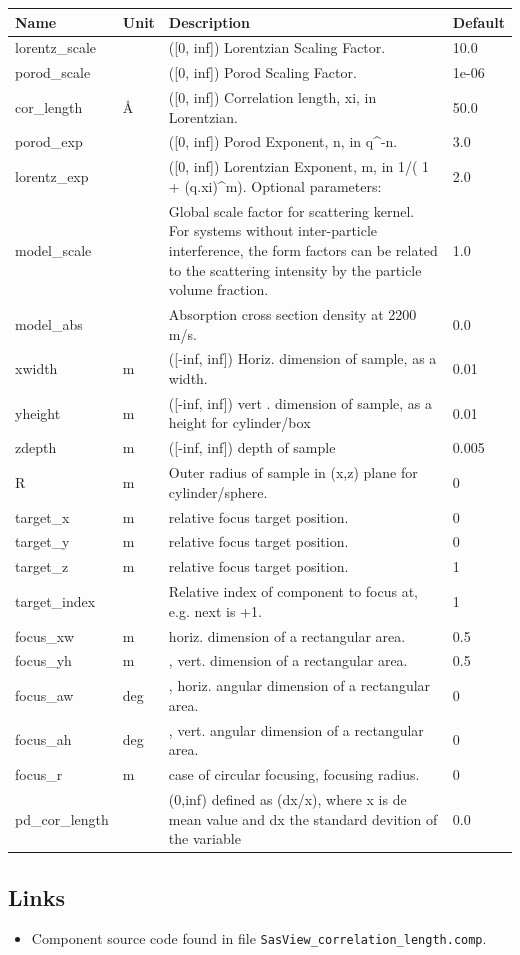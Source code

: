 \begin{longtable}{p{}p{}p{}p{}}
\toprule
\textbf{Name} & \textbf{Unit} & \textbf{Description} & \textbf{Default} \\
\midrule
\endhead
lorentz\_scale &  & ([0, inf]) Lorentzian Scaling Factor. & 10.0 \\
porod\_scale &  & ([0, inf]) Porod Scaling Factor. & 1e-06 \\
cor\_length & \AA{} & ([0, inf]) Correlation length, xi, in Lorentzian. & 50.0 \\
porod\_exp &  & ([0, inf]) Porod Exponent, n, in q\textasciicircum{}-n. & 3.0 \\
lorentz\_exp &  & ([0, inf]) Lorentzian Exponent, m, in 1/( 1 + (q.xi)\textasciicircum{}m). Optional parameters: & 2.0 \\
model\_scale &   & Global scale factor for scattering kernel. For systems without inter-particle interference, the form factors can be related to the scattering intensity by the particle volume fraction. & 1.0 \\
model\_abs &   & Absorption cross section density at 2200 m/s. & 0.0 \\
xwidth & m & ([-inf, inf]) Horiz. dimension of sample, as a width. & 0.01 \\
yheight & m & ([-inf, inf]) vert . dimension of sample, as a height for cylinder/box & 0.01 \\
zdepth & m & ([-inf, inf]) depth of sample & 0.005 \\
R & m & Outer radius of sample in (x,z) plane for cylinder/sphere. & 0 \\
target\_x & m & relative focus target position. & 0 \\
target\_y & m & relative focus target position. & 0 \\
target\_z & m & relative focus target position. & 1 \\
target\_index &   & Relative index of component to focus at, e.g. next is +1. & 1 \\
focus\_xw & m & horiz. dimension of a rectangular area. & 0.5 \\
focus\_yh & m & , vert. dimension of a rectangular area. & 0.5 \\
focus\_aw & deg & , horiz. angular dimension of a rectangular area. & 0 \\
focus\_ah & deg & , vert. angular dimension of a rectangular area. & 0 \\
focus\_r & m & case of circular focusing, focusing radius. & 0 \\
pd\_cor\_length &  & (0,inf) defined as (dx/x), where x is de mean value and dx the standard devition of the variable & 0.0 \\
\bottomrule
\end{longtable}

\subsection*{Links}
\begin{itemize}
  \item Component source code found in file \texttt{SasView\_correlation\_length.comp}.
\end{itemize}
